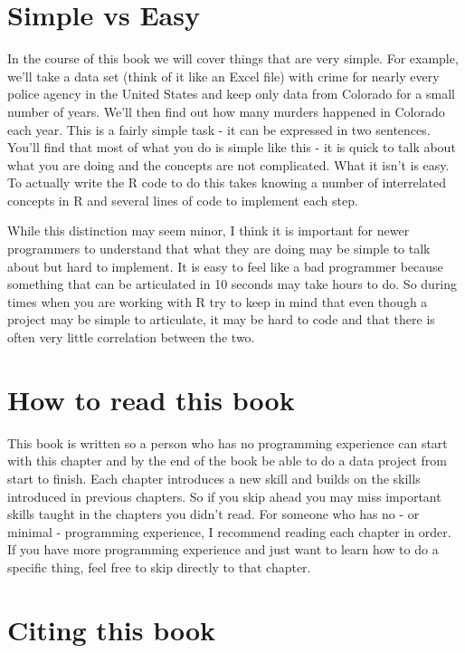 \documentclass[
]{krantz}
\begin{document}
\hypertarget{simple-vs-easy}{%
\section*{Simple vs Easy}\label{simple-vs-easy}}


In the course of this book we will cover things that are
very simple. For example, we'll take a data set (think of it
like an Excel file) with crime for nearly every police
agency in the United States and keep only data from Colorado
for a small number of years. We'll then find out how many
murders happened in Colorado each year. This is a fairly
simple task - it can be expressed in two sentences. You'll
find that most of what you do is simple like this - it is
quick to talk about what you are doing and the concepts are
not complicated. What it isn't is easy. To actually write
the R code to do this takes knowing a number of interrelated
concepts in R and several lines of code to implement each
step.

While this distinction may seem minor, I think it is
important for newer programmers to understand that what they
are doing may be simple to talk about but hard to implement.
It is easy to feel like a bad programmer because something
that can be articulated in 10 seconds may take hours to do.
So during times when you are working with R try to keep in
mind that even though a project may be simple to articulate,
it may be hard to code and that there is often very little
correlation between the two.

\hypertarget{how-to-read-this-book}{%
\section*{How to read this
book}\label{how-to-read-this-book}}


This book is written so a person who has no programming
experience can start with this chapter and by the end of the
book be able to do a data project from start to finish. Each
chapter introduces a new skill and builds on the skills
introduced in previous chapters. So if you skip ahead you
may miss important skills taught in the chapters you didn't
read. For someone who has no - or minimal - programming
experience, I recommend reading each chapter in order. If
you have more programming experience and just want to learn
how to do a specific thing, feel free to skip directly to
that chapter.

\hypertarget{citing-this-book}{%
\section*{Citing this book}\label{citing-this-book}}
\end{document}
